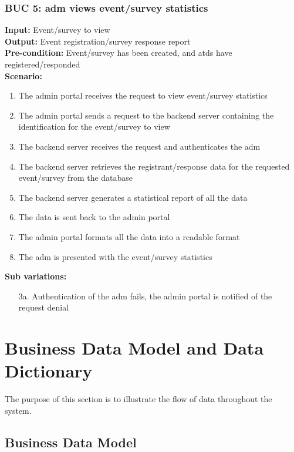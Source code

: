 \documentclass[12pt]{article}
\begin{document}
\subsubsection*{BUC 5: \Gls{adm} views event/survey statistics}
\textbf{Input:} Event/survey to view \\
\textbf{Output:} Event registration/survey response report \\
\textbf{Pre-condition:} Event/survey has been created, and \glspl{atd} have registered/responded \\
\textbf{Scenario:} \\
\begin{enumerate}
  \item The admin portal receives the request to view event/survey statistics
  \item The admin portal sends a request to the backend server containing the identification for the event/survey to view
  \item The backend server receives the request and authenticates the \gls{adm}
  \item The backend server retrieves the registrant/response data for the requested event/survey from the database
  \item The backend server generates a statistical report of all the data
  \item The data is sent back to the admin portal
  \item The admin portal formats all the data into a readable format
  \item The \gls{adm} is presented with the event/survey statistics
\end{enumerate}
\textbf{Sub variations:}
\begin{itemize}
  \item [3a.] Authentication of the \gls{adm} fails, the admin portal is notified of the request denial
\end{itemize}

\section{Business Data Model and Data Dictionary}

The purpose of this section is to illustrate the flow of data throughout the system.

\subsection{Business Data Model}
\end{document}
